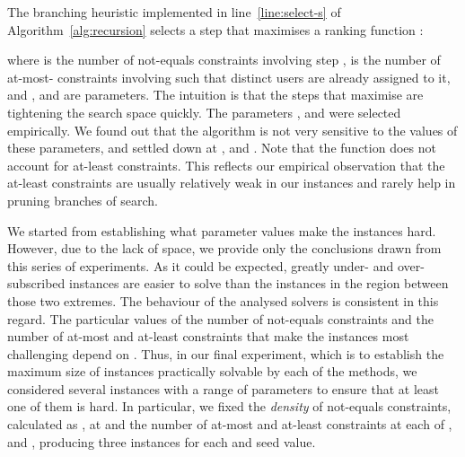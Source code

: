 \documentclass[runningheads,proof]{llncs}
\begin{document}
\bigskip

The branching heuristic implemented in line~\ref{line:select-s} of Algorithm~\ref{alg:recursion} selects a step  that maximises a ranking function :

where  is the number of not-equals constraints involving step ,  is the number of at-most- constraints involving  such that  distinct users are already assigned to it, and ,  and  are parameters.  The intuition is that the steps  that maximise  are tightening the search space quickly.  The parameters ,  and  were selected empirically.  We found out that the algorithm is not very sensitive to the values of these parameters, and settled down at ,  and .  Note that the function does not account for at-least constraints.  This reflects our empirical observation that the at-least constraints are usually relatively weak in our instances and rarely help in pruning branches of search.




\bigskip

We started from establishing what parameter values make the instances hard.  
However, due to the lack of space, we provide only the conclusions drawn from this series of experiments.
As it could be expected, greatly under- and over-subscribed instances are easier to solve than the instances in the region between those two extremes.
The behaviour of the analysed solvers is consistent in this regard.
The particular values of the number of not-equals constraints  and the number  of at-most and at-least constraints that make the instances most challenging depend on .
Thus, in our final experiment, which is to establish the maximum size  of instances practically solvable by each of the methods, we considered several instances with a range of parameters to ensure that at least one of them is hard.
In particular, we fixed the \emph{density} of not-equals constraints, calculated as , at  and the number  of at-most and at-least constraints at each of ,  and , producing three instances for each  and seed value.
\end{document}
